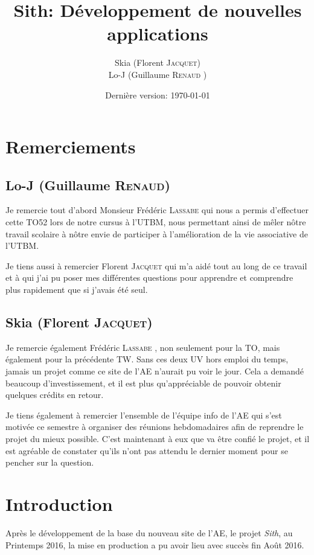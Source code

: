 \documentclass[a4paper]{report}
\title{Sith: Développement de nouvelles applications}
\author{Skia (Florent \textsc{Jacquet})\\
Lo-J (Guillaume \textsc{Renaud} )}
\date{Dernière version: \today}
\begin{document}
\maketitle

\tableofcontents

\chapter*{Remerciements}
\section*{Lo-J (Guillaume \textsc{Renaud})}
\par Je remercie tout d'abord Monsieur Frédéric \textsc{Lassabe}  qui nous a permis d'effectuer cette TO52 lors de notre cursus à
l'UTBM, nous permettant ainsi de mêler nôtre travail scolaire à nôtre envie de participer à l'amélioration de la vie
associative de l'UTBM.

\par Je tiens aussi à remercier Florent \textsc{Jacquet}  qui m'a aidé tout au long de ce travail et à qui j'ai pu poser mes
différentes questions pour apprendre et comprendre plus rapidement que si j'avais été seul.

\section*{Skia (Florent \textsc{Jacquet})}
\par Je remercie également Frédéric \textsc{Lassabe} , non seulement pour la TO, mais également pour la précédente TW. Sans ces
deux UV hors emploi du temps, jamais un projet comme ce site de l'AE n'aurait pu voir le jour. Cela a demandé beaucoup
d'investissement, et il est plus qu'appréciable de pouvoir obtenir quelques crédits en retour.

\par Je tiens également à remercier l'ensemble de l'équipe info de l'AE qui s'est motivée ce semestre à organiser des
réunions hebdomadaires afin de reprendre le projet du mieux possible. C'est maintenant à eux que va être confié le
projet, et il est agréable de constater qu'ils n'ont pas attendu le dernier moment pour se pencher sur la question.


\chapter*{Introduction}
\par Après le développement de la base du nouveau site de l'AE, le projet \emph{Sith}, au Printemps 2016, la mise en
production a pu avoir lieu avec succès fin Août 2016.
\end{document}
